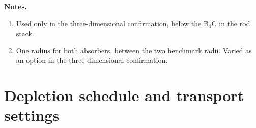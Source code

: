 \noindent \textbf{Notes.}
\begin{enumerate}[label=(\alph*), nosep]
  \item Used only in the three-dimensional confirmation, below the B$_4$C in the rod stack.
  \item One radius for both absorbers, between the two benchmark radii. Varied as an option in the three-dimensional confirmation.
\end{enumerate}

\section{Depletion schedule and transport settings}
\label{app:inputs-numerics}

\small
\setlength{\tabcolsep}{3pt}
